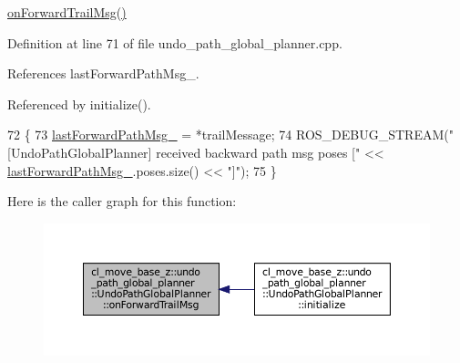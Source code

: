 \hyperlink{classcl__move__base__z_1_1undo__path__global__planner_1_1UndoPathGlobalPlanner_ae5e3c5922ceb8783a6a01d904fc9c230}{on\+Forward\+Trail\+Msg()} 

Definition at line 71 of file undo\+\_\+path\+\_\+global\+\_\+planner.\+cpp.



References last\+Forward\+Path\+Msg\+\_\+.



Referenced by initialize().


\begin{DoxyCode}
72         \{
73             \hyperlink{classcl__move__base__z_1_1undo__path__global__planner_1_1UndoPathGlobalPlanner_a9a4a6e40f5b6cb5f77dedbc5b6170871}{lastForwardPathMsg\_} = *trailMessage;
74             ROS\_DEBUG\_STREAM(\textcolor{stringliteral}{"[UndoPathGlobalPlanner] received backward path msg poses ["} << 
      \hyperlink{classcl__move__base__z_1_1undo__path__global__planner_1_1UndoPathGlobalPlanner_a9a4a6e40f5b6cb5f77dedbc5b6170871}{lastForwardPathMsg\_}.poses.size() << \textcolor{stringliteral}{"]"});
75         \}
\end{DoxyCode}
Here is the caller graph for this function\+:
\nopagebreak
\begin{figure}[H]
\begin{center}
\leavevmode
\includegraphics[width=350pt]{classcl__move__base__z_1_1undo__path__global__planner_1_1UndoPathGlobalPlanner_ae5e3c5922ceb8783a6a01d904fc9c230_icgraph}
\end{center}
\end{figure}
\mbox{\label{classcl__move__base__z_1_1undo__path__global__planner_1_1UndoPathGlobalPlanner_a37a85e1cd57173902d8302cb8cb9b933}} 
